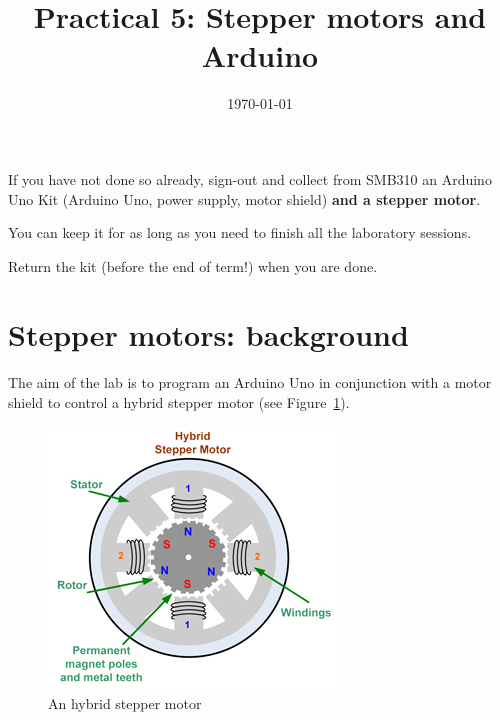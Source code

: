 \documentclass{instructions}
\title{Practical 5: Stepper motors and Arduino}
\date{\today}
\begin{document}
\maketitle




\pagebreak

\intro



If you have not done so already, sign-out and collect from SMB310 an Arduino Uno
Kit (Arduino Uno, power supply, motor shield) \textbf{and a stepper motor}.

You can keep it for as long as you need to finish all the laboratory sessions.

Return the kit (before the end of term!) when you are done.


\part{Stepper motors: background}

The aim of the lab is to program an Arduino Uno in conjunction with a
motor shield to control a hybrid stepper motor (see Figure~\ref{stepper}).


\begin{figure}[h!]
    \centering
    \includegraphics{figs/image3.png}
    \caption{An hybrid stepper motor}
    \label{stepper}
\end{figure}
\end{document}

